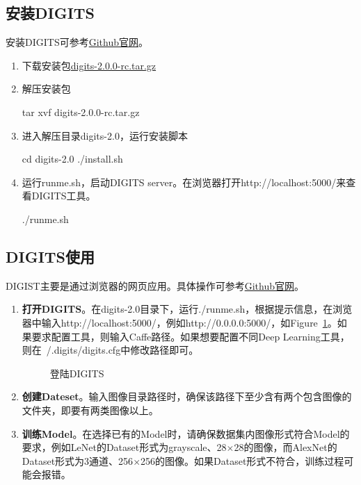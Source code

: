 \subsection{安装DIGITS}
安装DIGITS可参考\href{http://devblogs.nvidia.com/parallelforall/digits-deep-learning-gpu-training-system/}{Github官网}。
\begin{enumerate}
\item 下载安装包\href{https://developer.nvidia.com/digits}{digits-2.0.0-rc.tar.gz}
\item 解压安装包
\begin{bash}
tar xvf digits-2.0.0-rc.tar.gz
\end{bash}
\item 进入解压目录digits-2.0，运行安装脚本
\begin{bash}
cd digits-2.0
./install.sh
\end{bash}
\item 运行runme.sh，启动DIGITS server。在浏览器打开http://localhost:5000/来查看DIGITS工具。
\begin{bash}
./runme.sh
\end{bash}
\end{enumerate}

\subsection{DIGITS使用}
DIGIST主要是通过浏览器的网页应用。具体操作可参考\href{https://github.com/NVIDIA/DIGITS/blob/digits-2.0/docs/GettingStarted.md}{Github官网}。
\begin{enumerate}
\item \textbf{打开DIGITS}。在digits-2.0目录下，运行./runme.sh，根据提示信息，在浏览器中输入http://localhost:5000/，例如http://0.0.0.0:5000/，如Figure~\ref{fig:digits}。如果要求配置工具，则输入Caffe路径。如果想要配置不同Deep Learning工具，则在~/.digits/digits.cfg中修改路径即可。
\begin{figure}[!ht]
  \centering 
  \caption{登陆DIGITS}
  \label{fig:digits}
\end{figure}

\item \textbf{创建Dateset}。输入图像目录路径时，确保该路径下至少含有两个包含图像的文件夹，即要有两类图像以上。

\item \textbf{训练Model}。在选择已有的Model时，请确保数据集内图像形式符合Model的要求，例如LeNet的Dataset形式为grayscale、28$\times$28的图像，而AlexNet的Dataset形式为3通道、256$\times$256的图像。如果Dataset形式不符合，训练过程可能会报错。
\end{enumerate}

